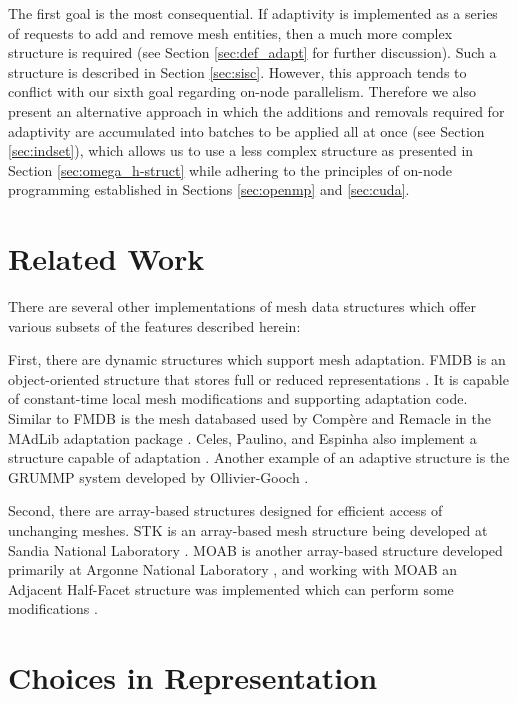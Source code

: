 The first goal is the most consequential.
If adaptivity is implemented as a series of requests to
add and remove mesh entities, then a much more complex structure is required
(see Section \ref{sec:def_adapt} for further discussion).
Such a structure is described in Section \ref{sec:sisc}.
However, this approach tends to conflict with our sixth goal regarding
on-node parallelism.
Therefore we also present an alternative
approach in which the additions and removals required for adaptivity
are accumulated into batches to be applied all at once
(see Section \ref{sec:indset}), which allows us to use a less complex structure
as presented in Section \ref{sec:omega_h-struct} while adhering to the
principles of on-node programming established in Sections
\ref{sec:openmp} and \ref{sec:cuda}.

\section{Related Work}

There are several other implementations of mesh data structures
which offer various subsets of the features described herein:

First, there are dynamic structures which support mesh adaptation.
FMDB is an object-oriented structure that
stores full or reduced representations \cite{seol2005fmdb,seol2006efficient}.
It is capable of constant-time local
mesh modifications and supporting adaptation code.
Similar to FMDB is the mesh databased used by Comp\`{e}re and Remacle
in the MAdLib adaptation package \cite{compere2010mesh}.
Celes, Paulino, and Espinha also implement a structure capable of
adaptation \cite{celes2005compact}.
Another example of an adaptive structure
is the GRUMMP system developed by Ollivier-Gooch \cite{grummpweb}.

Second, there are array-based structures designed for
efficient access of unchanging meshes.
STK is an array-based mesh structure being developed at
Sandia National Laboratory \cite{edwards2010sierra}.
MOAB is another array-based structure developed primarily
at Argonne National Laboratory \cite{tautges_moab:_2004},
and working with MOAB an Adjacent Half-Facet structure
was implemented which can perform some modifications \cite{dyedov2014ahf}.

\section{Choices in Representation}

